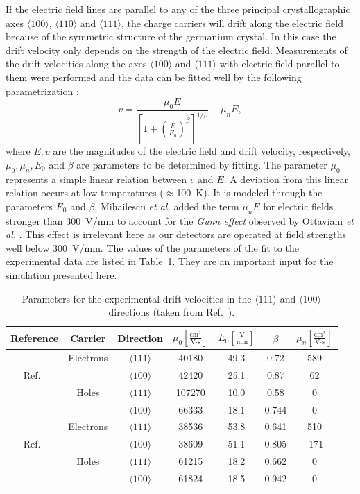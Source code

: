\documentclass[epj]{svjour}
\begin{document}
If the electric field lines are parallel to any of the three principal
crystallographic axes $\langle 100 \rangle$, $\langle 110 \rangle$ and
$\langle 111 \rangle$, the charge carriers will drift along the
electric field because of the symmetric structure of the germanium
crystal. In this case the drift velocity only depends on the strength
of the electric field. Measurements of the drift velocities along the
axes $\langle 100 \rangle$ and $\langle 111 \rangle$ with electric
field parallel to them were performed and the data can be fitted well
by the following parametrization \cite{Kno99}:
\begin{equation} 
\label{eq:pss:para} 
v = \frac{\mu_{0}E}{[1+(\frac{E}{E_{0}})^{\beta}]^{1/\beta}} - \mu_{n}E, 
\end{equation} 
where $E, v$ are the magnitudes of the electric field and drift
velocity, respectively, $\mu_{0}, \mu_{n}, E_{0}$ and $\beta$ are
parameters to be determined by fitting. The parameter $\mu_{0}$
represents a simple linear relation between $v$ and $E$. A deviation
from this linear relation occurs at low temperatures
($\approx$100~K). It is modeled through the parameters $E_{0}$ and
$\beta$. Mihailescu \textit{et al.} \cite{miha} added the term
$\mu_{n}E$ for electric fields stronger than 300~V/mm to account for
the \emph{Gunn effect} observed by Ottaviani \textit{et al.}
\cite{otta}. This effect is irrelevant here as our detectors are
operated at field strengths well below 300~V/mm. The values of the
parameters of the fit to the experimental data are listed in
Table~\ref{t:pars}. They are an important input for the simulation
presented here.
 
\begin{table}\centering
\caption{Parameters for the experimental drift velocities in the 
$\langle111\rangle$ and $\langle 100 \rangle$ directions 
(taken from Ref.~\cite{bart}).} 
\label{t:pars}
\begin{tabular*}{0.8\linewidth}{ccccccc}\hline\hline 
Reference & Carrier & Direction & $\mu_{0} \left[ \frac{\mbox{cm}^{2}}{\mbox{V}\cdot\mbox{s}} \right]$ & $E_{0} \left[ \frac{\mbox{V}}{\mbox{mm}} \right]$ & $\beta$ & $\mu_{n} \left[ \frac{\mbox{cm}^{2}}{\mbox{V}\cdot\mbox{s}} \right]$ \\\hline 
& Electrons & $\langle111\rangle$ & 40180 & 49.3 & 0.72 & 589 \\ 
Ref.~\cite{miha}& & $\langle100\rangle$ & 42420 & 25.1 & 0.87 & 62\\ 
& Holes & $\langle111\rangle$ & 107270 & 10.0 & 0.58 & 0 \\ 
& & $\langle100\rangle$ & 66333 & 18.1 & 0.744 & 0 \\\hline 
& Electrons & $\langle111\rangle$ & 38536 & 53.8 & 0.641 & 510 \\ 
Ref.~\cite{bart}& & $\langle100\rangle$ & 38609 & 51.1 & 0.805 & -171\\  
& Holes & $\langle111\rangle$ & 61215 & 18.2 & 0.662 & 0 \\ 
& & $\langle100\rangle$ & 61824 & 18.5 & 0.942 & 0 \\\hline\hline 
\end{tabular*} 
\end{table} 
 
\end{document}
